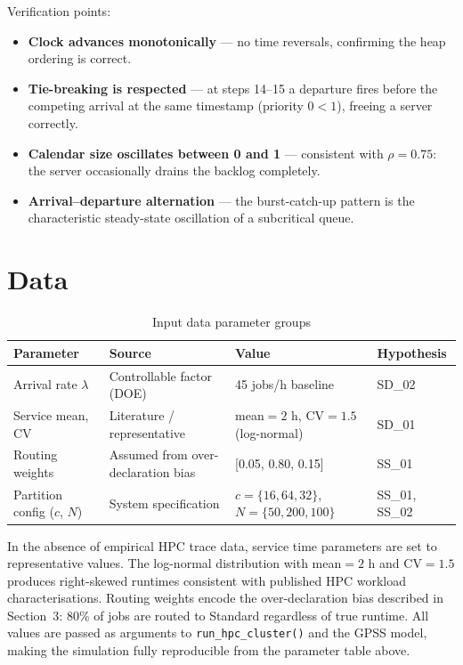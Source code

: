 \documentclass[11pt,a4paper]{article}
\newcommand{\lam}{\ensuremath{\lambda}}
\begin{document}
Verification points:
\begin{itemize}
  \item \textbf{Clock advances monotonically} — no time reversals, confirming the heap ordering is correct.
  \item \textbf{Tie-breaking is respected} — at steps 14--15 a departure fires before the competing
  arrival at the same timestamp (priority $0 < 1$), freeing a server correctly.
  \item \textbf{Calendar size oscillates between 0 and 1} — consistent with $\rho=0.75$: the server
  occasionally drains the backlog completely.
  \item \textbf{Arrival--departure alternation} — the burst-catch-up pattern is the characteristic
  steady-state oscillation of a subcritical queue.
\end{itemize}

\section{Data}

\begin{table}[H]
\centering
\caption{Input data parameter groups}
\begin{tabularx}{\linewidth}{llL{3cm}l}
\toprule
\textbf{Parameter} & \textbf{Source} & \textbf{Value} & \textbf{Hypothesis} \\
\midrule
Arrival rate $\lam$       & Controllable factor (DOE) & 45 jobs/h baseline & SD\_02 \\
Service mean, CV          & Literature / representative & mean$=2$ h, CV$=1.5$ (log-normal) & SD\_01 \\
Routing weights           & Assumed from over-declaration bias & [0.05, 0.80, 0.15] & SS\_01 \\
Partition config ($c$, $N$) & System specification & $c=\{16,64,32\}$, $N=\{50,200,100\}$ & SS\_01, SS\_02 \\
\bottomrule
\end{tabularx}
\end{table}

In the absence of empirical HPC trace data, service time parameters are set to representative values. The
log-normal distribution with mean$=2$ h and CV$=1.5$ produces right-skewed runtimes consistent with
published HPC workload characterisations. Routing weights encode the over-declaration bias described in
Section~3: 80\% of jobs are routed to Standard regardless of true runtime. All values are passed as
arguments to \texttt{run\_hpc\_cluster()} and the GPSS model, making the simulation fully reproducible
from the parameter table above.
\end{document}
